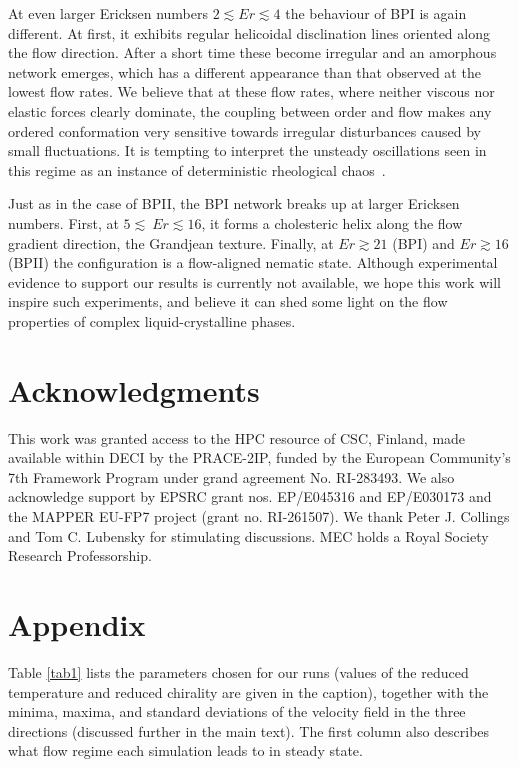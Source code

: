 \documentclass[8.5pt,twoside,twocolumn]{article}
\begin{document}
At even larger Ericksen numbers $2\lesssim Er \lesssim 4$ the behaviour of BPI is again different.
At first, it exhibits regular helicoidal disclination lines oriented along the flow direction.
After a short time these become irregular and an amorphous network emerges, which has 
a different appearance than that observed at the lowest flow rates.
We believe that at these flow rates, where neither viscous nor elastic forces clearly dominate, 
the coupling between order and flow makes any ordered conformation very sensitive towards 
irregular disturbances caused by small fluctuations.
It is tempting to
interpret the unsteady oscillations seen in this regime as an instance of 
deterministic rheological chaos~\cite{fielding, Cates:2002}.

Just as in the case of BPII, the BPI network breaks up at larger Ericksen numbers. 
First, at $5\lesssim\ Er\lesssim 16$, it forms a cholesteric helix along the flow gradient 
direction, the Grandjean texture. Finally, at $Er\gtrsim21$ (BPI) and $Er\gtrsim16$ (BPII) the configuration
is a flow-aligned nematic state.
Although experimental evidence to support
our results is currently not available, we hope this work will inspire such experiments, 
and believe it can shed some light on the flow properties of complex liquid-crystalline phases.

\section*{Acknowledgments}

This work was granted access to the HPC resource of CSC, Finland, made available 
within DECI by the PRACE-2IP, funded by the European Community's 7th Framework 
Program under grand agreement No. RI-283493. We also acknowledge support by 
EPSRC grant nos. EP/E045316 and EP/E030173 and the MAPPER EU-FP7 project 
(grant no. RI-261507). We thank Peter J. Collings and Tom C. Lubensky for stimulating discussions. 
MEC holds a Royal Society Research Professorship.

\appendix
\section*{Appendix}

Table \ref{tab1} lists the parameters chosen for our runs (values of
the reduced temperature and reduced chirality are given in the caption),
together with the minima, maxima, and standard deviations of the velocity
field in the three directions (discussed further in the main text). 
The first column also describes what flow regime each simulation
leads to in steady state.
\end{document}
